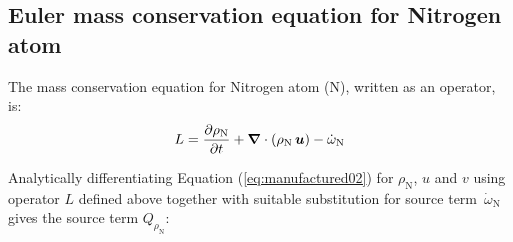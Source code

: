 \documentclass[10pt]{article}
\newcommand{\diff}[2] {\dfrac{\partial #1 }{\partial #2}}
\newcommand{\gv}[1]{\ensuremath{\mbox{\boldmath$ #1 $}}}%
\newcommand{\grad}[1]{\gv{\nabla} #1}
\newcommand{\bv}[1]{\ensuremath{\mbox{\boldmath$ #1 $}}}
\begin{document}
 \begin{landscape}
\section{Euler mass conservation equation for Nitrogen atom}

The mass conservation equation for Nitrogen atom (N), written as an operator, is:
\begin{equation}
 \label{eq:euler2d_11}
L= \diff{\rho_\text{N}}{t} + \grad{}\cdot \left(\rho_\text{N}\,\bv{u}\right) - \dot{\omega}_{\text{N}}
\end{equation}

Analytically differentiating Equation (\ref{eq:manufactured02}) for $\rho_{\text{N}}$, $u$ and $v$ using operator $L$ defined above together with suitable substitution for source term~$\dot{\omega}_\text{N}$ gives the source term $Q_{\rho_{\text{N}}}$:


\end{landscape}
\end{document}
